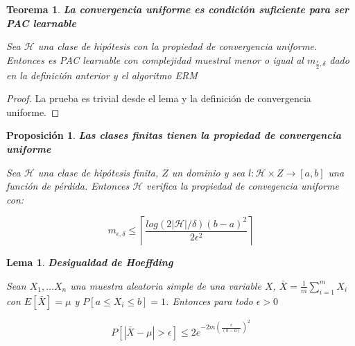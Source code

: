 \documentclass[11pt]{article}
\newtheorem{theorem}{Teorema}
\newtheorem{fact}{Proposición}
\newtheorem{lemma}{Lema}
\begin{document}
\begin{theorem}
\textbf{La convergencia uniforme es condición suficiente para ser PAC learnable}

Sea $\mathcal{H}$ una clase de hipótesis con la propiedad de convergencia uniforme. Entonces es PAC learnable con complejidad muestral menor o igual al $m_{\frac{\epsilon}{2}, \delta}$ dado en la definición anterior y el algoritmo ERM
\end{theorem}

\begin{proof}
La prueba es trivial desde el lema y la definición de convergencia uniforme.
\end{proof}

\begin{fact}
\textbf{Las clases finitas tienen la propiedad de convergencia uniforme}

Sea $\mathcal{H}$ una clase de hipótesis finita, $Z$ un dominio y sea $l : \mathcal{H} \times Z \rightarrow [a,b]$ una función de pérdida. Entonces $\mathcal{H}$ verifica la propiedad de convegencia uniforme con: 

\[m_{\epsilon, \delta} \le \left\lceil \frac{log(2|\mathcal{H}|/\delta)(b-a)^2}{2\epsilon^2} \right\rceil\]
\end{fact}

\begin{lemma}
\textbf{Desigualdad de Hoeffding}

Sean $X_1, \ldots X_n$ una muestra aleatoria simple de una variable $X$, $\bar{X} = \frac{1}{m} \sum_{i=1}^m X_i$ con $E[\bar{X}] = \mu$ y $P[a \le X_i \le b] = 1$. Entonces para todo $\epsilon > 0$

\[P\left[\left| \bar{X} - \mu \right| > \epsilon \right] \le 2e^{-2m \left(\frac{\epsilon}{(b-a)}\right)^2} \]
\end{lemma}
\end{document}
